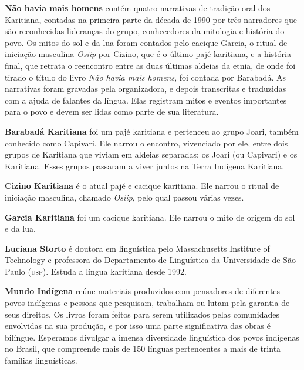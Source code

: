  \textbf{Não havia mais homens} contém quatro narrativas de tradição oral dos Karitiana, contadas na primeira parte da década de 1990 por três narradores que são reconhecidas lideranças do grupo, conhecedores da mitologia e história do povo. Os mitos do sol e da lua foram contados pelo cacique Garcia, o ritual de iniciação masculina \textit{Osiip} por Cizino, que é o último pajé karitiana, e a história final, que retrata o reencontro entre as duas últimas aldeias da etnia, de onde foi tirado o título do livro \textit{Não havia mais homens}, foi contada por Barabadá. As narrativas foram gravadas pela organizadora, e depois transcritas e traduzidas com a ajuda de falantes da língua. Elas registram mitos e eventos importantes para o povo e devem ser lidas como parte de sua literatura.

\textbf{Barabadá Karitiana} foi um pajé karitiana e pertenceu ao grupo Joari, também conhecido como Capivari. Ele narrou o encontro, vivenciado por ele, entre dois grupos de Karitiana que viviam em aldeias separadas: os Joari (ou Capivari) e os Karitiana. Esses grupos passaram a viver juntos na Terra Indígena Karitiana.

\textbf{Cizino Karitiana} é o atual pajé e cacique karitiana. Ele narrou o ritual de iniciação masculina, chamado \textit{Osiip}, pelo qual passou várias vezes.

\textbf{Garcia Karitiana} foi um cacique karitiana. Ele narrou o mito de origem do sol e da lua.

\textbf{Luciana Storto} é doutora em linguística pelo Massachusetts Institute of Technology e professora do Departamento de Linguística da Universidade de São Paulo (\textsc{usp}). Estuda a língua karitiana desde 1992.

\textbf{Mundo Indígena} reúne materiais produzidos com pensadores de diferentes povos indígenas e pessoas que pesquisam, trabalham ou lutam pela garantia de seus direitos. Os livros foram feitos para serem utilizados pelas comunidades envolvidas na sua produção, e por isso uma parte significativa das obras é bilíngue. Esperamos divulgar a imensa diversidade linguística dos povos indígenas no Brasil, que compreende mais de 150 línguas pertencentes a mais de trinta famílias linguísticas.

